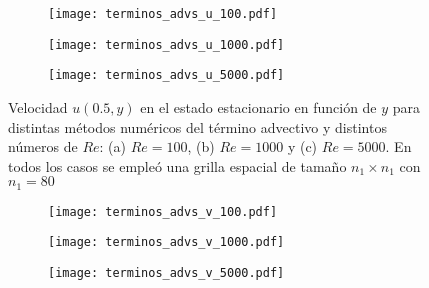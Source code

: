 \documentclass[aps,prb,twocolumn,superscriptaddress,floatfix,longbibliography,10pt]{revtex4-2}
\newcounter{para}
\begin{document}
\begin{figure}
  \centering
  \begin{subfigure}[b]{0.32\textwidth}
      \centering
      \texttt{[image: terminos\_advs\_u\_100.pdf]}
      \caption{}
      \label{fig:terminos_advs_u_100}
  \end{subfigure}
  \hfill
  \begin{subfigure}[b]{0.32\textwidth}
      \centering
      \texttt{[image: terminos\_advs\_u\_1000.pdf]}
      \caption{}
      \label{fig:terminos_advs_u_1000}
  \end{subfigure}
  \hfill
  \begin{subfigure}[b]{0.32\textwidth}
      \centering
      \texttt{[image: terminos\_advs\_u\_5000.pdf]}
      \caption{}
      \label{fig:terminos_advs_u_5000}
  \end{subfigure}
     \caption{Velocidad $u(0.5,y)$ en el estado estacionario en función de $y$ para distintas métodos numéricos del término advectivo y distintos números de $Re$: (a) $Re = 100$, (b) $Re = 1000$ y (c) $Re = 5000$. En todos los casos se empleó una grilla espacial de tamaño $n_1 \times n_1$ con $n_1 = 80$}
     \label{fig:terminos_advs_u}
\end{figure}

\begin{figure}
  \centering
  \begin{subfigure}[b]{0.32\textwidth}
    \centering
    \texttt{[image: terminos\_advs\_v\_100.pdf]}
    \caption{}
    \label{fig:terminos_advs_v_100}
  \end{subfigure}
  \hfill
  \begin{subfigure}[b]{0.32\textwidth}
    \centering
    \texttt{[image: terminos\_advs\_v\_1000.pdf]}
    \caption{}
    \label{fig:terminos_advs_v_1000}
  \end{subfigure}
  \hfill
  \begin{subfigure}[b]{0.32\textwidth}
    \centering
    \texttt{[image: terminos\_advs\_v\_5000.pdf]}
    \caption{}
    \label{fig:terminos_advs_v_5000}
  \end{subfigure}
     \caption{}
     \label{fig:terminos_advs_v}
\end{figure}
\end{document}
